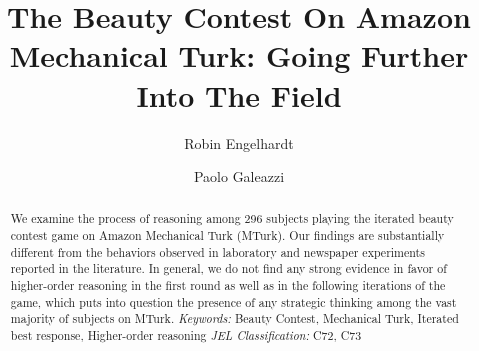 \documentclass[12pt,review]{elsarticle}
\providecommand{\keywords}[1]{\textit{Keywords:} #1}
\providecommand{\JEL}[1]{\textit{JEL Classification:} #1}
\begin{document}
%


\begin{frontmatter}
\title{The Beauty Contest On Amazon Mechanical Turk: Going Further Into The Field}

\author{Robin Engelhardt}
\author{Paolo Galeazzi}
\address{Center for Information and Bubble Studies, University of Copenhagen, Karen Blixens Plads 8, 2300 Copenhagen, Denmark}


\begin{abstract}
We examine the process of reasoning among 296 subjects playing the
iterated beauty contest game on Amazon Mechanical Turk (MTurk). Our findings
are substantially different from the behaviors observed in laboratory
and newspaper experiments reported in the literature. In general,
we do not find any strong evidence in favor of higher-order reasoning
in the first round as well as in the following iterations of the game,
which puts into question the presence of any strategic thinking among
the vast majority of subjects on MTurk.
\newline
\keywords{Beauty Contest,  Mechanical Turk,  Iterated best response,  Higher-order reasoning}
\newline
\JEL{C72, C73}
\end{abstract}


\end{frontmatter}

\linenumbers
\end{document}
